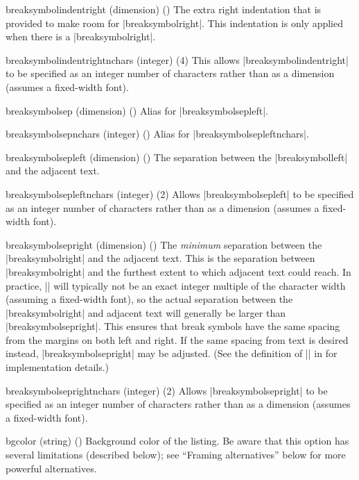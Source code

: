 \begin{optionlist}
\item[breaksymbolindentright (dimension) (\meta{breaksymbolindentrightnchars})]
The extra right indentation that is provided to make room for |breaksymbolright|.  This indentation is only applied when there is a |breaksymbolright|.

\item[breaksymbolindentrightnchars (integer) (4)]
This allows |breaksymbolindentright| to be specified as an integer number of characters rather than as a dimension (assumes a fixed-width font).


\item[breaksymbolsep (dimension) (\meta{breaksymbolsepleftnchars})]
Alias for |breaksymbolsepleft|.

\item[breaksymbolsepnchars (integer) (\meta{breaksymbolsepleftnchars})]
Alias for |breaksymbolsepleftnchars|.


\item[breaksymbolsepleft (dimension) (\meta{breaksymbolsepleftnchars})]
The separation between the |breaksymbolleft| and the adjacent text. 

\item[breaksymbolsepleftnchars (integer) (2)]
Allows |breaksymbolsepleft| to be specified as an integer number of characters rather than as a dimension (assumes a fixed-width font).


\item[breaksymbolsepright (dimension) (\meta{breaksymbolseprightnchars})]
The \emph{minimum} separation between the |breaksymbolright| and the adjacent text.  This is the separation between |breaksymbolright| and the furthest extent to which adjacent text could reach.  In practice, |\linewidth| will typically not be an exact integer multiple of the character width (assuming a fixed-width font), so the actual separation between the |breaksymbolright| and adjacent text will generally be larger than |breaksymbolsepright|.  This ensures that break symbols have the same spacing from the margins on both left and right.  If the same spacing from text is desired instead, |breaksymbolsepright| may be adjusted.  (See the definition of |\FV@makeLineNumber| in  for implementation details.)

\item[breaksymbolseprightnchars (integer) (2)]
Allows |breaksymbolsepright| to be specified as an integer number of characters rather than as a dimension (assumes a fixed-width font).


  \item[bgcolor (string) (\meta{none})]
    Background color of the listing.  Be aware that this option has several limitations (described below); see ``Framing alternatives'' below for more powerful alternatives.


\end{optionlist}
